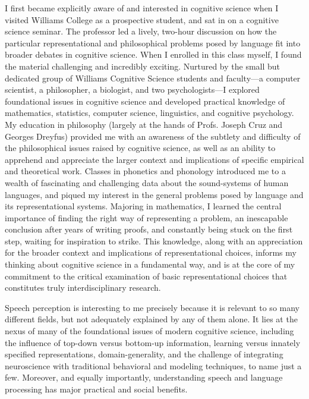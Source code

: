 \documentclass[12pt]{article}
\begin{document}
I first became explicitly aware of and interested in cognitive science when I visited Williams College as a prospective student, and sat in on a cognitive science seminar.  The professor led a lively, two-hour discussion on how the particular representational and philosophical problems posed by language fit into broader debates in cognitive science.  When I enrolled in this class myself, I found the material challenging and incredibly exciting.  Nurtured by the small but dedicated group of Williams Cognitive Science students and faculty---a computer scientist, a philosopher, a biologist, and two psychologists---I explored foundational issues in cognitive science and developed practical knowledge of mathematics, statistics, computer science, linguistics, and cognitive psychology.  My education in philosophy (largely at the hands of Profs. Joseph Cruz and Georges Dreyfus) provided me with an awareness of the subtlety and difficulty of the philosophical issues raised by cognitive science, as well as an ability to apprehend and appreciate the larger context and implications of specific empirical and theoretical work.  Classes in phonetics and phonology introduced me to a wealth of fascinating and challenging data about the sound-systems of human languages, and piqued my interest in the general problems posed by language and its representational systems.  Majoring in mathematics, I learned the central importance of finding the right way of representing a problem, an inescapable conclusion after years of writing proofs, and constantly being stuck on the first step, waiting for inspiration to strike.  This knowledge, along with an appreciation for the broader context and implications of representational choices, informs my thinking about cognitive science in a fundamental way, and is at the core of my commitment to the critical examination of basic representational choices that constitutes truly interdisciplinary research. 

Speech perception is interesting to me precisely because it is relevant to so many different fields, but not adequately explained by any of them alone.  It lies at the nexus of many of the foundational issues of modern cognitive science, including the influence of top-down versus bottom-up information, learning versus innately specified representations, domain-generality, and the challenge of integrating neuroscience with traditional behavioral and modeling techniques, to name just a few.  Moreover, and equally importantly, understanding speech and language processing has major practical and social benefits.
\end{document}
